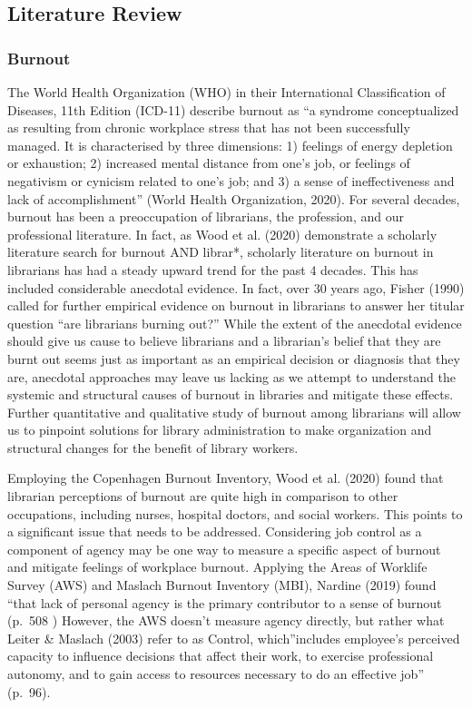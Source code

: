 \documentclass[
  twocolumn]{article}
\begin{document}
\subsection{Literature Review}\label{literature-review}

\subsubsection{Burnout}\label{burnout}

The World Health Organization (WHO) in their International
Classification of Diseases, 11th Edition (ICD-11) describe burnout as
``a syndrome conceptualized as resulting from chronic workplace stress
that has not been successfully managed. It is characterised by three
dimensions: 1) feelings of energy depletion or exhaustion; 2) increased
mental distance from one's job, or feelings of negativism or cynicism
related to one's job; and 3) a sense of ineffectiveness and lack of
accomplishment'' (World Health Organization, 2020). For several decades,
burnout has been a preoccupation of librarians, the profession, and our
professional literature. In fact, as Wood et al. (2020) demonstrate a
scholarly literature search for burnout AND librar*, scholarly
literature on burnout in librarians has had a steady upward trend for
the past 4 decades. This has included considerable anecdotal evidence.
In fact, over 30 years ago, Fisher (1990) called for further empirical
evidence on burnout in librarians to answer her titular question ``are
librarians burning out?'' While the extent of the anecdotal evidence
should give us cause to believe librarians and a librarian's belief that
they are burnt out seems just as important as an empirical decision or
diagnosis that they are, anecdotal approaches may leave us lacking as we
attempt to understand the systemic and structural causes of burnout in
libraries and mitigate these effects. Further quantitative and
qualitative study of burnout among librarians will allow us to pinpoint
solutions for library administration to make organization and structural
changes for the benefit of library workers.

Employing the Copenhagen Burnout Inventory, Wood et al. (2020) found
that librarian perceptions of burnout are quite high in comparison to
other occupations, including nurses, hospital doctors, and social
workers. This points to a significant issue that needs to be addressed.
Considering job control as a component of agency may be one way to
measure a specific aspect of burnout and mitigate feelings of workplace
burnout. Applying the Areas of Worklife Survey (AWS) and Maslach Burnout
Inventory (MBI), Nardine (2019) found ``that lack of personal agency is
the primary contributor to a sense of burnout (p.~508 ) However, the AWS
doesn't measure agency directly, but rather what Leiter \& Maslach
(2003) refer to as Control, which''includes employee's perceived
capacity to influence decisions that affect their work, to exercise
professional autonomy, and to gain access to resources necessary to do
an effective job'' (p.~96).
\end{document}
